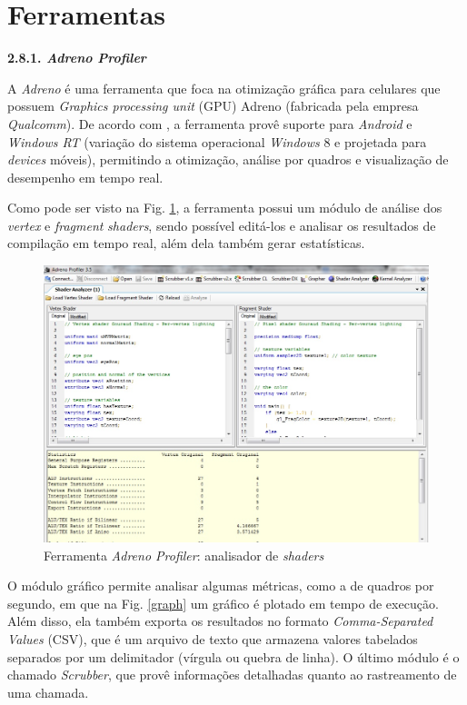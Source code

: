 \section{Ferramentas}

\begin{description} 

	\item \textbf{2.8.1. \textit{Adreno Profiler}}

	A \textit{Adreno} é uma ferramenta que foca na otimização gráfica para celulares que possuem \textit{Graphics processing unit} (GPU) Adreno (fabricada pela empresa \textit{Qualcomm}). De acordo com  \cite{adp}, a ferramenta provê suporte para \textit{Android} e \textit{Windows RT} (variação do sistema operacional \textit{Windows} 8  e projetada para \textit{devices} móveis), permitindo a otimização, análise por quadros e visualização de desempenho em tempo real. 

	Como pode ser visto na Fig. \ref{adrenoProfiler}, a ferramenta possui um módulo de análise dos \textit{vertex} e \textit{fragment} \textit{shaders}, sendo possível editá-los e analisar os resultados de compilação em tempo real, além dela também gerar estatísticas.  

	\begin{figure}[h]
	\centering
		\includegraphics[keepaspectratio=true,scale=0.4]{figuras/shader_analyzer.jpg}
	\caption{Ferramenta \textit{Adreno Profiler}: analisador de \textit{shaders}}
	\label{adrenoProfiler}
	\end{figure}

	O módulo gráfico permite analisar algumas métricas, como a de quadros por segundo, em que na Fig. \ref{graph} um gráfico é plotado em tempo de execução. Além disso, ela também exporta os resultados no formato \textit{Comma-Separated Values} (CSV), que é um arquivo de texto que armazena valores tabelados separados por um delimitador (vírgula ou quebra de linha). O último módulo é o chamado \textit{Scrubber}, que provê informações detalhadas quanto ao rastreamento de uma chamada. 


\end{description}
